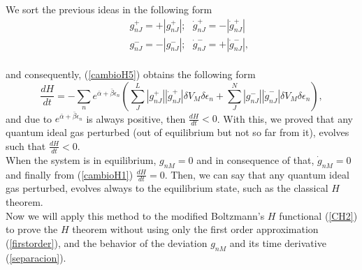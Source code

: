 \documentclass{article}
\begin{document}
We sort the previous ideas in the following form
\begin{eqnarray}
   &&g^{+}_{nJ}=+|g^{+}_{nJ}|; \ \ \  \dot{g}^{+}_{nJ}=-|\dot{g}^{+}_{nJ}| \nonumber \\
   &&g^{-}_{nJ}=-|g^{-}_{nJ}|; \ \ \ \dot{g}^{-}_{nJ}=+|\dot{g}^{-}_{nJ}| \label{separacion},
\end{eqnarray}{}
\\
and consequently, (\ref{cambioH5}) obtains the following form
\begin{equation}
    \frac{dH}{dt}=-\sum_n  e^{\bar{\alpha}+\bar{\beta}\epsilon_n}\left(\sum_J ^{L} |g^{+}_{nJ}||\dot{g}^{+}_{nJ}|\delta V_M \delta \epsilon_n+\sum^{N}_J  |g^{-}_{nJ}||\dot{g}^{-}_{nJ}|\delta V_M \delta \epsilon_n \right), \label{cambioH6}
\end{equation}{}
and due to $e^{\bar{\alpha}+\bar{\beta}\epsilon_n}$ is always positive, then $\frac{dH}{dt}<0$. With this, we proved that any quantum ideal gas perturbed (out of equilibrium but not so far from it), evolves such that $\frac{dH}{dt}<0$.\\
When the system is in equilibrium, $g_{nM}=0$ and in consequence of that, $\dot g_{nM}=0$ and finally from (\ref{cambioH1}) $\frac{dH}{dt}=0$. Then, we can say that any quantum ideal gas perturbed, evolves always to the equilibrium state, such as the classical $H$ theorem. \\
Now we will apply this method to the modified Boltzmann's $H$ functional (\ref{CH2}) to prove the $H$ theorem without using only the first order approximation (\ref{firstorder}), and the behavior of the deviation $g_{nM}$ and its time derivative (\ref{separacion}).
\end{document}
